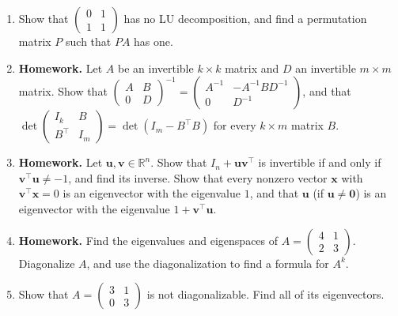 \documentclass[11pt]{article}
\newcommand{\homework}{\textcolor{red!70!black}{\textbf{Homework.}}}
\theoremstyle{definition}
\theoremstyle{plain}
\theoremstyle{remark}
\begin{document}
\begin{enumerate}[leftmargin=*]
	\begin{enumerate}
		\item Find the LU decomposition of $A$, and use it to compute $\det(A)$ and to solve $A\mathbf{x} = (2, 8, 10)^\top$.
		\item Let $D$ be the diagonal matrix with the diagonal entries of $U$. Check that $U = DL^\top$, so that $A = LDL^\top$. Show that every invertible symmetric matrix that has an LU decomposition can be written as $A = LDL^\top$ in this way. (Hint: uniqueness.)
	\end{enumerate}
	\item Show that $\begin{pmatrix} 0 & 1 \\ 1 & 1 \end{pmatrix}$ has no LU decomposition, and find a permutation matrix $P$ such that $PA$ has one.
	\item \homework{} Let $A$ be an invertible $k \times k$ matrix and $D$ an invertible $m \times m$ matrix. Show that $\begin{pmatrix} A & B \\ 0 & D \end{pmatrix}^{-1} = \begin{pmatrix} A^{-1} & -A^{-1}BD^{-1} \\ 0 & D^{-1} \end{pmatrix}$, and that $\det\begin{pmatrix} I_k & B \\ B^\top & I_m \end{pmatrix} = \det(I_m - B^\top B)$ for every $k \times m$ matrix $B$.
	\item \homework{} Let $\mathbf{u}, \mathbf{v} \in \mathbb{R}^n$. Show that $I_n + \mathbf{u}\mathbf{v}^\top$ is invertible if and only if $\mathbf{v}^\top \mathbf{u} \neq -1$, and find its inverse. Show that every nonzero vector $\mathbf{x}$ with $\mathbf{v}^\top \mathbf{x} = 0$ is an eigenvector with the eigenvalue $1$, and that $\mathbf{u}$ (if $\mathbf{u} \neq \mathbf{0}$) is an eigenvector with the eigenvalue $1 + \mathbf{v}^\top \mathbf{u}$.
	\item \homework{} Find the eigenvalues and eigenspaces of $A = \begin{pmatrix} 4 & 1 \\ 2 & 3 \end{pmatrix}$. Diagonalize $A$, and use the diagonalization to find a formula for $A^k$.
	\item Show that $A = \begin{pmatrix} 3 & 1 \\ 0 & 3 \end{pmatrix}$ is not diagonalizable. Find all of its eigenvectors.

\end{enumerate}
\end{document}
